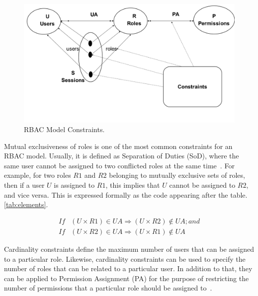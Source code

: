 \begin{figure}[bht]
\centering
\includegraphics[scale=0.26]{modelConstraints.png}
\caption{RBAC Model Constraints.}
\label{fig:RBACPol}
\end{figure}

Mutual exclusiveness of roles is one of the most common constraints for an RBAC model.  Usually, it is defined as Separation of Duties (SoD), where the same user cannot be assigned to two conflicted roles at the same time~\cite{FeKu2009}.  For example, for two roles $R1$ and $R2$ belonging to mutually exclusive sets of roles, then if a user $U$ is assigned to $R1$, this implies that $U$ cannot be assigned to $R2$, and vice versa.  This is expressed formally as the code appearing after the table.\ref{tab:elements}.
  
 
\begin{align*} 
If&  (U \times R1) \in UA \Rightarrow  (U \times R2) \notin UA ;     and \\
If&  (U \times R2) \in UA \Rightarrow (U \times R1) \notin UA
\end{align*}    


Cardinality constraints define the maximum number of users that can be assigned to a particular role.  Likewise, cardinality constraints can be used to specify the number of roles that can be related to a particular user.  In addition to that, they can be applied to Permission Assignment (PA) for the purpose of restricting the number of permissions that a particular role should be assigned to~\cite{SDAG2008}.


